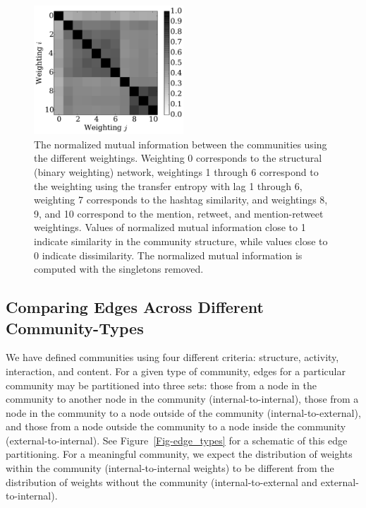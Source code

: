 \begin{figure}[h!]
  \centering
\includegraphics[width=0.50\textwidth]{figures/nmi_singletons.pdf}
\caption{The normalized mutual information between the communities using the different weightings. Weighting 0 corresponds to the structural (binary weighting) network, weightings 1 through 6 correspond to the weighting using the transfer entropy with lag 1 through 6, weighting 7 corresponds to the hashtag similarity, and weightings 8, 9, and 10 correspond to the mention, retweet, and mention-retweet weightings. Values of normalized mutual information close to 1 indicate similarity in the community structure, while values close to 0 indicate dissimilarity. The normalized mutual information is computed with the singletons removed.}
\label{Fig-compare_coverings}
\end{figure}

\subsection{Comparing Edges Across Different Community-Types}

We have defined communities using four different criteria: structure, activity, interaction, and content. For a given type of community, edges for a particular community may be partitioned into three sets: those from a node in the community to another node in the community (internal-to-internal), those from a node in the community to a node outside of the community (internal-to-external), and those from a node outside the community to a node inside the community (external-to-internal). See Figure~\ref{Fig-edge_types} for a schematic of this edge partitioning. For a meaningful community, we expect the distribution of weights within the community (internal-to-internal weights) to be different from the distribution of weights without the community (internal-to-external and external-to-internal).

